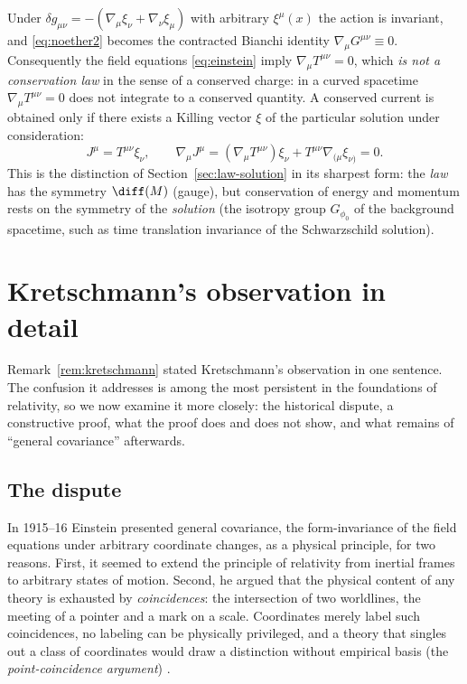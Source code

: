 Under $\delta g_{\mu\nu}=-(\nabla_\mu\xi_\nu+\nabla_\nu\xi_\mu)$ with arbitrary
$\xi^\mu(x)$ the action is invariant, and \eqref{eq:noether2} becomes the
contracted Bianchi identity $\nabla_\mu G^{\mu\nu}\equiv0$. Consequently the
field equations \eqref{eq:einstein} imply $\nabla_\mu T^{\mu\nu}=0$, which
\emph{is not a conservation law} in the sense of a conserved charge: in a
curved spacetime $\nabla_\mu T^{\mu\nu}=0$ does not integrate to a conserved
quantity. A conserved current is obtained only if there exists a Killing vector
$\xi$ of the particular solution under consideration:
\begin{equation}
  J^\mu=T^{\mu\nu}\xi_\nu,\qquad
  \nabla_\mu J^\mu=(\nabla_\mu T^{\mu\nu})\xi_\nu+T^{\mu\nu}\nabla_{(\mu}\xi_{\nu)}=0.
\end{equation}
This is the distinction of Section~\ref{sec:law-solution} in its
sharpest form: the \emph{law} has the symmetry $\diff(M)$ (gauge), but
conservation of energy and momentum rests on the symmetry of the \emph{solution}
(the isotropy group $G_{\phi_0}$ of the background spacetime, such as time
translation invariance of the Schwarzschild solution).

\section{Kretschmann's observation in detail}
\label{sec:kretschmann}

Remark~\ref{rem:kretschmann} stated Kretschmann's observation in one
sentence. The confusion it addresses is among the most persistent in the
foundations of relativity, so we now examine it more closely: the historical
dispute, a constructive proof, what the proof does and does not show, and what
remains of ``general covariance'' afterwards.

\subsection{The dispute}

In 1915--16 Einstein presented general covariance, the form-invariance of the
field equations under arbitrary coordinate changes, as a physical principle,
for two reasons. First, it seemed to extend the principle of relativity from
inertial frames to arbitrary states of motion. Second, he argued that the
physical content of any theory is exhausted by \emph{coincidences}: the
intersection of two worldlines, the meeting of a pointer and a mark on a
scale. Coordinates merely label such coincidences, no labeling can be
physically privileged, and a theory that singles out a class of coordinates
would draw a distinction without empirical basis (the \emph{point-coincidence
argument}) \cite{norton}.

